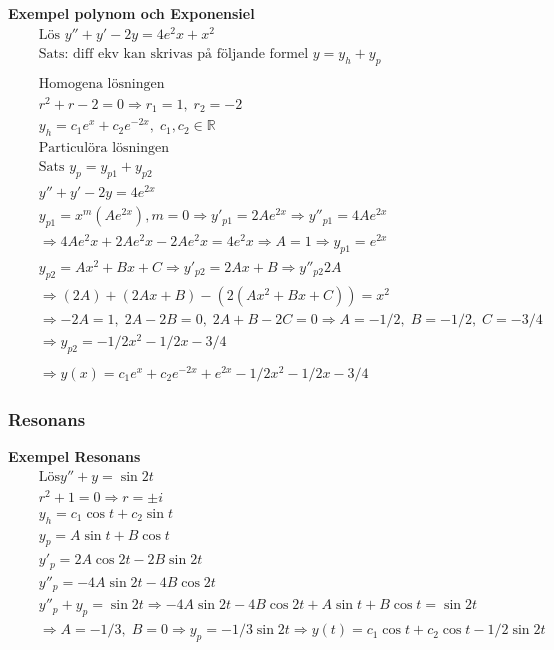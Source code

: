 \textbf{Exempel polynom och Exponensiel}
\begin{align*} %
  &\quad  \text{Lös }  y'' + y' -2y = 4e^2x + x^2 \\
  &\quad  \text{Sats: diff ekv kan skrivas på följande formel } y=y_h+y_p \\
  &\quad  \\
  &\quad  \text{Homogena lösningen } \\
  &\quad  r^2+r-2=0 \Rightarrow r_1=1, \; r_2=-2 \\
  &\quad  y_h=c_1e^x+c_2e^{-2x}, \; c_1,c_2\in\mathbb{R} \\
  &\quad  \text{Particulöra lösningen } \\
  &\quad  \text{Sats } y_p = y_{p1} + y_{p2} \\
  &\quad  y''+y'-2y=4e^{2x} \\
  &\quad  y_{p1}=x^m(Ae^{2x}), m=0 \Rightarrow  y'_{p1} = 2Ae^{2x} \Rightarrow  y''_{p1} = 4Ae^{2x} \\
  &\quad  \Rightarrow 4Ae^2x+2Ae^2x-2Ae^2x=4e^2x \Rightarrow A=1 \Rightarrow y_{p1}=e^{2x} \\
  &\quad  y_{p2} =  Ax^2+Bx+C \Rightarrow y'_{p2}=2Ax+B \Rightarrow y''_{p2}2A \\
  &\quad  \Rightarrow (2A) + (2Ax+B) - (2(Ax^2+Bx+C)) = x^2 \\
  &\quad  \Rightarrow -2A=1, \; 2A-2B=0, \; 2A+B-2C=0
  \Rightarrow A=-1/2, \; B=-1/2, \; C=-3/4 \\
  &\quad  \Rightarrow y_{p2}=-1/2x^2-1/2x-3/4 \\
  &\quad  \\
  &\quad  \Rightarrow y(x)=c_1e^x+c_2e^{-2x}+e^{2x}-1/2x^2-1/2x-3/4
\end{align*}


\newpage


\subsubsection{Resonans}
\textbf{Exempel Resonans}
\begin{align*}
  &\quad  \text{Lös} y''+y=\sin{2t} \\
  &\quad  r^2 +1 = 0 \Rightarrow r=\pm i \\
  &\quad  y_h=c_1\cos{t}+c_2\sin{t} \\
  &\quad  y_p=A\sin{t}+B\cos{t} \\
  &\quad  y'_p=2A\cos{2t}-2B\sin{2t} \\
  &\quad  y''_p=-4A\sin{2t}-4B\cos{2t} \\
  &\quad  y''_p + y_p = \sin{2t} \Rightarrow -4A\sin{2t}-4B\cos{2t} +  A\sin{t}+B\cos{t} = \sin{2t} \\
  &\quad  \Rightarrow A=-1/3, \; B=0 \Rightarrow y_p =-1/3\sin{2t} \Rightarrow
  y(t) = c_1\cos{t} + c_2\cos{t} -1/2\sin{2t} \\
\end{align*}


